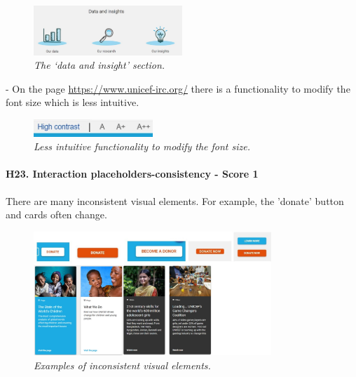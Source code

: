 \begin{figure}[!h]
	\begin{center}
		\includegraphics[width=0.5\textwidth]{FinalScores25.jpg}
		\captionsetup{font=small}
		\caption{\textit{The ‘data and insight’ section.}}
	\end{center}
\end{figure}
\newline -	On the page \href{https://www.unicef-irc.org/}{https://www.unicef-irc.org/} there is a functionality to modify the font size which is less intuitive.
\begin{figure}[!h]
	\begin{center}
		\includegraphics[width=0.4\textwidth]{FinalScores26.jpg}
		\captionsetup{font=small}
		\caption{\textit{Less intuitive functionality to modify the font size.}}
	\end{center}
\end{figure}
\newline
\newline \paragraph{H23. Interaction placeholders-consistency - Score 1}  \label{subsec:H23}	There are many inconsistent visual elements. For example, the 'donate' button and cards often change.
\begin{figure}[!h]
	\begin{center}
		\includegraphics[width=0.8\textwidth]{FinalScores27.jpg}
		\captionsetup{font=small}
		\caption{\textit{Examples of inconsistent visual elements.}}
	\end{center}
\end{figure}
